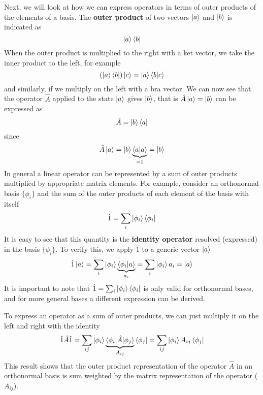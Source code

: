 \documentclass[../Main/chem532-notes.tex]{subfiles}
\begin{document}
Next, we will look at how we can express operators in terms of outer products of the elements of a basis.
The \textbf{outer product} of two vectors $\ket{a}$ and $\ket{b}$ is indicated as
\begin{equation}
\ket{a}\bra{b}
\end{equation}
When the outer product is multiplied to the right with a ket vector, we take the inner product to the left, for example
\begin{equation}
(\ket{a}\bra{b}) \ket{c} = \ket{a} \braket{b|c}
\end{equation}
and similarly, if we multiply on the left with a bra vector.
We can now see that the operator $\hat{A}$ applied to the state $\ket{a}$ gives $\ket{b}$, that is $\hat{A}\ket{a} = \ket{b}$ can be expressed as
\begin{equation}
\hat{A} = \ket{b}\bra{a}
\end{equation}
since 
\begin{equation}
\hat{A} \ket{a} = \ket{b} \underbrace{\braket{a|a} }_{=1} = \ket{b}
\end{equation}
In general a linear operator can be represented by a sum of outer products multiplied by appropriate matrix elements.
For example, consider an orthonormal basis $\{ \phi_i \}$ and the sum of the outer products of each element of the basis with itself
\begin{equation}
\hat{1} = \sum_i \ket{\phi_i}\bra{\phi_i}
\end{equation}
It is easy to see that this quantity is the \textbf{identity operator} resolved (expressed) in the basis $\{ \phi_i \}$. To verify this, we apply $\hat{1}$ to a generic vector $\ket{a}$
\begin{equation}
\hat{1}\ket{a} = \sum_i \ket{\phi_i}\underbrace{\braket{\phi_i | a}}_{a_i}
= \sum_i \ket{\phi_i} a_i = \ket{a}
\end{equation}
It is important to note that $\hat{1} = \sum_i \ket{\phi_i}\bra{\phi_i}$ is only valid for orthonormal bases, and for more general bases a different expression can be derived. 

To express an operator as a sum of outer products, we can just multiply it on the left and right with the identity
\begin{equation}
\hat{1}\hat{A}\hat{1} = \sum_{ij} \ket{\phi_i}\underbrace{\braket{\phi_i | \hat{A} |\phi_j}}_{A_{ij}} \bra{\phi_j}
= \sum_{ij} \ket{\phi_i} A_{ij} \bra{\phi_j}
\end{equation}
This result shows that the outer product representation of the operator $\hat{A}$ in an orthonormal basis is sum weighted by the matrix representation of the operator ($ A_{ij}$).
\end{document}
